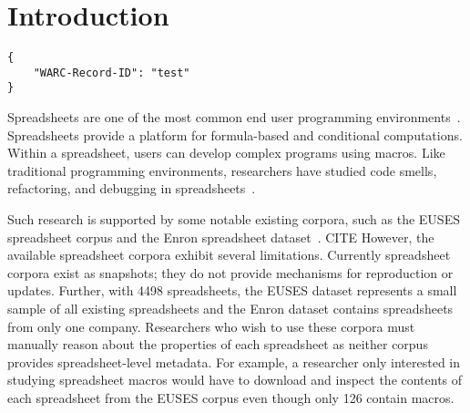 \documentclass[conference]{IEEEtran}
\begin{document}

\section{Introduction}

\begin{verbatim}
{
    "WARC-Record-ID": "test"
}
\end{verbatim}


Spreadsheets are one of the most common end user programming environments~\cite{Scaffidi2005}. 
Spreadsheets provide a platform for formula-based and conditional computations. 
Within a spreadsheet, users can develop complex programs using macros. 
Like traditional programming environments, researchers have studied code smells, refactoring, and debugging in spreadsheets~\cite{Pinzger2012,Badame2012,Abraham2007}.

Such research is supported by some notable existing corpora, such as the EUSES spreadsheet corpus and the Enron spreadsheet dataset~\cite{Fisher2005}. CITE
However, the available spreadsheet corpora exhibit several limitations.
Currently spreadsheet corpora exist as snapshots; they do not provide mechanisms for reproduction or updates.
Further, with 4498 spreadsheets, the EUSES dataset represents a small sample of all existing spreadsheets and the Enron dataset contains spreadsheets from only one company.
Researchers who wish to use these corpora must manually reason about the properties of each spreadsheet as neither corpus provides spreadsheet-level metadata.
For example, a researcher only interested in studying spreadsheet macros would have to download and inspect the contents of each spreadsheet from the EUSES corpus even though only 126 contain macros.
\end{document}

